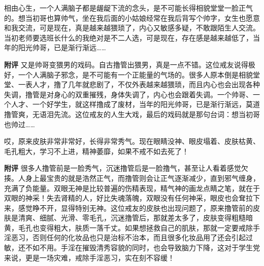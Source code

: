 \begin{case}[变丑]
    相由心生，一个人满脑子都是龌龊下流的念头，是不可能长得相貌堂堂一脸正气的。想当初哥也算帅气，坐在我后面的小姑娘经常在我后背写个帅字，女生也愿意和我交流，可是现在，真是越来越猥琐了，内心又敏感多疑，不敢跟陌生人交流。当初老师要选班长什么的我绝对是不二人选，可是现在，存在感是越来越低了，当年的阳光帅哥，已是渐行渐远……

    \textbf{附评} 又是帅哥变猥男的戏码。自古撸管出猥男，真是一点不错。这位戒友说得极好，一个人满脑子邪念，是不可能有一个正能量的气场的。很多人原本倒是相貌堂堂、一表人才，撸了几年就悲剧了，不仅外表越来越猥琐，而且内心也会出现各种失调，撸管是对身心的双重摧残，身体失调了，内心也会跟着失调。一个帅哥、一个人才、一个好学生，就这样撸成了废材，当年的阳光帅哥，已是渐行渐远，莫道撸管爽，无语泪先流。这位戒友的人生大戏，最后的戏码就是那句台词：想当初哥也帅过……
\end{case}

\begin{case}[变丑]
    哎，原来皮肤非常非常好，长得非常秀气。现在眼睛没神、眼皮塌着、皮肤枯黄、毛孔粗大，学习不上进，精神萎靡，如果不戒不如去死了！

    \textbf{附评} 很多人撸管前是一脸秀气，沉迷撸管后是一脸撸气，甚至让人看着感觉欠揍。人身上最宝贵的就是浩然正气，而撸管则会让正气逐渐减少，直到邪气缠身，充满了负能量。双眼无神是比较普遍的伤精表现，精气神的画龙点睛之笔，就在于双眼的神采！失去肾精的人，好比失魂落魄，双眼没有任何神采，眼皮也会耷拉下来，感觉睁不开，显得特别无神。这位戒友的皮肤也出现问题了，原来撸管前的皮肤是清爽、细腻、光滑、零毛孔，沉迷撸管后，那就差太多了，皮肤变得粗糙暗黄，毛孔也变得粗大，肤质一落千丈。如果想拯救自己的肌肤，那就一定要戒除手淫恶习，否则任何的化妆品也只是治标不治本，而且很多化妆品用了还会引起过敏，还不如不用。手淫在摧毁清秀容貌的同时，也会导致脑力下降，这对于学生党来说，更是一场灾难，戒除手淫恶习，实在刻不容缓！
\end{case}

